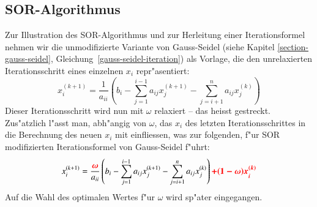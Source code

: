 \begin{refsection}
\section{SOR-Algorithmus\label{sec: SOR-Alg.}}
Zur Illustration des SOR-Algorithmus und zur Herleitung einer
Iterationsformel nehmen wir die unmodifizierte Variante von
Gauss-Seidel (siehe Kapitel \ref{section-gauss-seidel},
Gleichung~\ref{gauss-seidel-iteration}) als Vorlage, die den unrelaxierten
Iterationsschritt eines einzelnen $x_i$ repr"asentiert:
\begin{equation} \label{eq: G.-S.-It.formel}
x_i^{(k+1)} = \frac{1}{a_{ii}}\left(b_i-\sum\limits_{j=1}^{i-1} a_{ij}x_j^{(k+1)}-\sum\limits_{j=i+1}^na_{ij}x_j^{(k)}\right)
\end{equation}
Dieser Iterationsschritt wird nun mit $\omega$ relaxiert -- das heisst
gestreckt. Zus"atzlich l"asst man, abh"angig von $\omega$, das $x_i$
des letzten Iterationsschrittes in die Berechnung des neuen $x_i$ mit
einfliessen, was zur folgenden, f"ur SOR modifizierten Iterationsformel
von Gauss-Seidel f"uhrt:
\begin{equation} \label{eq: SOR-It.formel1}
	x_i^{(k+1)} = \frac{\boldsymbol{\textcolor{red}{\omega}}}{a_{ii}}\left(b_i-\sum\limits_{j=1}^{i-1}a_{ij}x_j^{(k+1)}-\sum\limits_{j=i+1}^n a_{ij}x_j^{(k)}\right)\boldsymbol{\textcolor{red}{+(1-\omega)x_i^{(k)}}}
\end{equation}
Auf die Wahl des optimalen Wertes f"ur $\omega$ wird sp"ater eingegangen.


\end{refsection}
